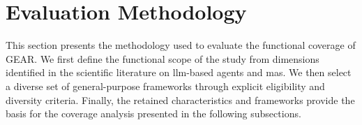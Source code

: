 \section{Evaluation Methodology}
\label{sec:evaluation-methodology}

This section presents the methodology used to evaluate the functional
coverage of GEAR. We first define the functional scope of the study from
dimensions identified in the scientific literature on \gls{llm}-based agents
and \gls{mas}. We then select a diverse set of general-purpose
frameworks through explicit eligibility and diversity criteria. Finally, the
retained characteristics and frameworks provide the basis for the
coverage analysis presented in the following subsections.



